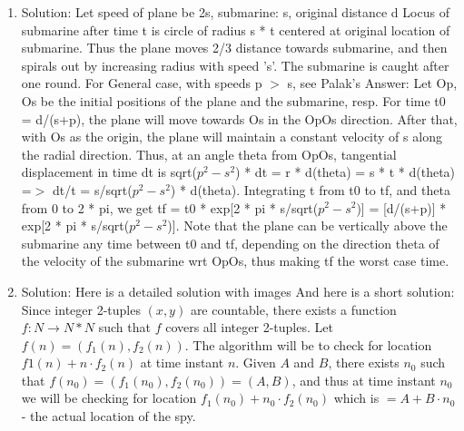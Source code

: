 \begin{enumerate}
\item
Solution: Let speed of plane be 2s, submarine: s, original distance d
Locus of submarine after time t is circle of radius s * t centered at original location of submarine. Thus the plane moves 2/3 distance towards submarine, and then spirals out by increasing radius with speed 's'. The submarine is caught after one round.
For General case, with speeds p $>$ s, see Palak's Answer:
Let Op, Os be the initial positions of the plane and the submarine, resp. For time t0 = d/(s+p), the plane will move towards Os in the OpOs direction. After that, with Os as the origin, the plane will maintain a constant velocity of s along the radial direction. Thus, at an angle theta from OpOs, tangential displacement in time dt is sqrt($p^2-s^2$) * dt = r * d(theta) = s * t * d(theta) =$>$ dt/t = s/sqrt($p^2-s^2$) * d(theta). Integrating t from t0 to tf, and theta from 0 to 2 * pi, we get tf = t0 * exp[2 * pi * s/sqrt($p^2-s^2$)] = [d/(s+p)] * exp[2 * pi * s/sqrt($p^2
-s^2$)].
Note that the plane can be vertically above the submarine any time between t0 and tf, depending on the direction theta of the velocity of the submarine wrt OpOs, thus making tf the worst case time.




\item
Solution: Here is a detailed solution with images
And here is a short solution:
Since integer 2-tuples $(x,y)$ are countable, there exists a function $f:N \rightarrow N*N$ such that $f$ covers all integer 2-tuples.
Let $f(n)=(f_1(n),f_2(n))$. The algorithm will be to check for location $f1(n) + n\cdot f_2(n)$ at time instant $n$.
Given $A$ and $B$, there exists $n_0$ such that $f(n_0)=(f_1(n_0),f_2(n_0))=(A,B)$, and thus at time instant $n_0$ we will be checking for location $f_1(n_0)+n_0 \cdot f_2(n_0)$ which is $= A+ B \cdot n_0$ - the actual location of the spy.





\end{enumerate}

